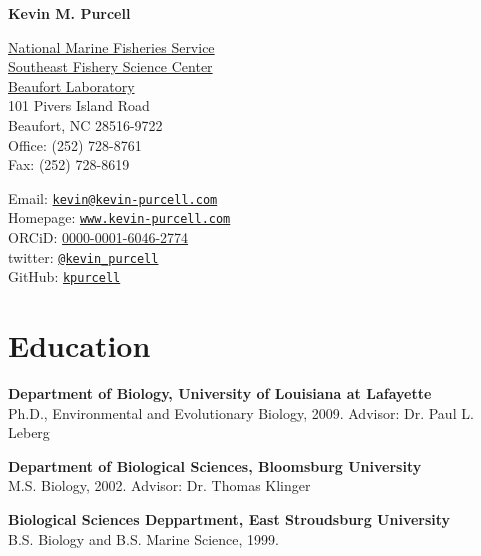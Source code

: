 \documentclass[letterpaper]{article}
\def\name{Kevin M. Purcell}
\renewenvironment{itemize}{
  \begin{list}{}{
    \setlength{\leftmargin}{1em}
  }
}{
  \end{list}
}
\begin{document}
\centerline{\huge\bf \name}
\hrulefill
\vspace{0.25in}

\begin{minipage}[t]{0.5\textwidth}
  \href{http://nmfs.noaa.gov/}{National Marine Fisheries Service}\\
  \href{http://www.sefsc.noaa.gov/labs/beaufort/}{Southeast Fishery Science Center}\\
  \href{http://www.biology.ull.edu/}{Beaufort Laboratory} \\
  101 Pivers Island Road \\
  Beaufort, NC 28516-9722 \\
  Office: (252) 728-8761 \\
  Fax: (252) 728-8619

\end{minipage}
\begin{minipage}[t]{0.5\textwidth}
  Email: \href{mailto:kevin@kevin-purcell.com}{\tt kevin@kevin-purcell.com} \\
  Homepage: \href{http:www.kevin-purcell.com/}{\tt www.kevin-purcell.com} \\
  ORCiD: \href{http://orcid.org/0000-0001-6046-2774}{0000-0001-6046-2774} \\
  twitter: \href{https://twitter.com/kevin_purcell}{\tt @kevin\_purcell} \\
  GitHub: \href{https://github.com/kpurcell}{\tt kpurcell}
\end{minipage}


\section*{Education}
	\begin{itemize}
		\item \textbf{Department of Biology, University of Louisiana at Lafayette}\\
    Ph.D., Environmental and Evolutionary Biology, 2009. Advisor: Dr. Paul L. Leberg

		\item \textbf{Department of Biological Sciences, Bloomsburg University} \\
			M.S. Biology, 2002. Advisor: Dr. Thomas Klinger
      
		\item \textbf{Biological Sciences Deppartment, East Stroudsburg University} \\
			B.S. Biology and B.S. Marine Science, 1999.
	\end{itemize}
\end{document}
